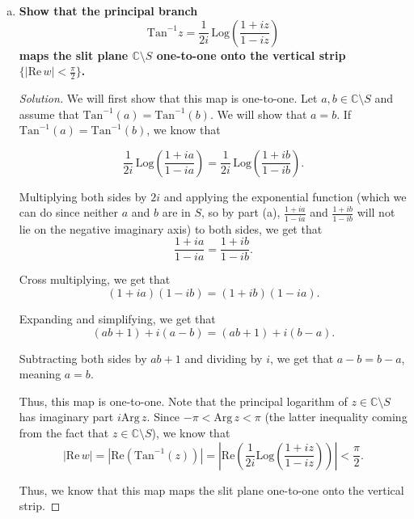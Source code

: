 \documentclass[11pt]{article}
\newcommand{\C}{\mathbb{C}}
\newenvironment{solution}
  {\renewcommand\qedsymbol{$\blacksquare$}\begin{proof}[Solution]}
  {\end{proof}}
\theoremstyle{definition}
\begin{document}
\begin{enumerate}[a)]
\begin{solution}
Thus, if $z \in S$, then $\frac{1+iz}{1-iz}$ must lie on the negative real axis $(-\infty, 0].$ \\

Since we have proved both directions of the if and only if, we know that $\frac{1+iz}{1-iz}$ lies on the negative real axis $(-\infty, 0]$ if and only if $z \in S$. \end{solution}
\item \textbf{Show that the principal branch 
\[ \mathrm{Tan}^{-1} z = \frac{1}{2i} \, \mathrm{Log} \left( \frac{1+iz}{1-iz} \right) \]
maps the slit plane $\C \setminus S$ one-to-one onto the vertical strip $\{ | \mathrm{Re} \, w | < \frac{\pi}{2}\}$.}

\begin{solution}
We will first show that this map is one-to-one. Let $a, b \in \C \setminus S$ and assume that $\mathrm{Tan}^{-1}(a) = \mathrm{Tan}^{-1}(b)$. We will show that $a = b$. If $\mathrm{Tan}^{-1}(a) = \mathrm{Tan}^{-1}(b)$, we know that

\[\frac{1}{2i} \, \mathrm{Log} \left( \frac{1+ia}{1-ia} \right) = \frac{1}{2i} \, \mathrm{Log} \left( \frac{1+ib}{1-ib} \right). \]

Multiplying both sides by $2i$ and applying the exponential function (which we can do since neither $a$ and $b$ are in $S$, so by part (a), $\frac{1+ia}{1-ia}$ and $\frac{1+ib}{1-ib}$ will not lie on the negative imaginary axis) to both sides, we get that
\[ \frac{1+ia}{1-ia} = \frac{1+ib}{1-ib}.\]

Cross multiplying, we get that \[ (1+ia)(1-ib) = (1+ib)(1-ia). \]

Expanding and simplifying, we get that
\[ (ab + 1) + i(a-b) = (ab + 1) + i(b-a). \]

Subtracting both sides by $ab+1$ and dividing by $i$, we get that $a-b = b-a$, meaning $a = b$.

Thus, this map is one-to-one. Note that the principal logarithm of $z \in \C \setminus S$ has imaginary part $i \mathrm{Arg} \, z.$ Since $-\pi < \mathrm{Arg} \, z < \pi$ (the latter inequality coming from the fact that $z \in \C \setminus S$), we know that 
\[ |\mathrm{Re} \, w| = |\mathrm{Re}(\mathrm{Tan}^{-1}(z))| = \left|\mathrm{Re}\left(\frac{1}{2i} \mathrm{Log} \left( \frac{1+iz}{1-iz} \right)\right)\right| < \frac{\pi}{2}. \]

Thus, we know that this map maps the slit plane one-to-one onto the vertical strip. 
\end{solution}


\end{enumerate}
\end{document}
